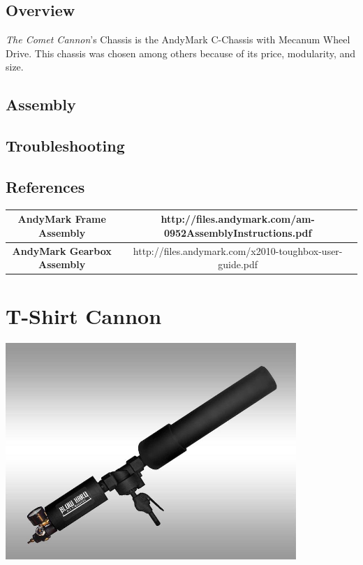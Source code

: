 \documentclass[letterpaper,12pt]{article}
\newcommand{\botname}{\textit{The Comet Cannon}}
\begin{document}
\subsection{Overview}
\botname's Chassis is the AndyMark C-Chassis with Mecanum Wheel Drive. This chassis was chosen among others because of its price, modularity, and size.

\subsection{Assembly}
\subsection{Troubleshooting}
\subsection{References}

\begin{table}[h!]
  \begin{tabular}{| c | c |}
    \hline
    \textbf{AndyMark Frame Assembly} &  http://files.andymark.com/am-0952AssemblyInstructions.pdf\\
    \hline
    \textbf{AndyMark Gearbox Assembly} &  http://files.andymark.com/x2010-toughbox-user-guide.pdf\\
    \hline
  \end{tabular}
  \label{tab:fire_cmd_msg}
\end{table}

\section{T-Shirt Cannon}
\begin{center}
    \includegraphics[width=11cm]{pics/cannon/blowhard_cannon.jpg}
\end{center}
\end{document}
